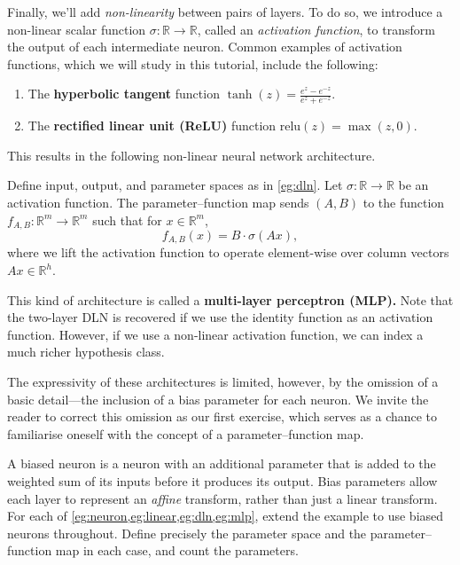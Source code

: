 \documentclass[11pt]{article}
\newcommand{\R}{\mathbb{R}}
\newcommand{\relu}{\mathrm{relu}}
\begin{document}
Finally, we'll add \emph{non-linearity} between pairs of layers. To do so, we
introduce a non-linear scalar function $\sigma : \R \to \R$, called an
\emph{activation function}, to transform the output of each intermediate
neuron. Common examples of activation functions, which we will study in this
tutorial, include the following:
\begin{enumerate}
    \item
        The \textbf{hyperbolic tangent} function
            $\displaystyle \tanh(z) = \frac{e^z-e^{-z}}{e^z + e^{-z}}$.
    \item
        The \textbf{rectified linear unit (ReLU)} function $\relu(z) = \max(z, 0)$.
\end{enumerate}
This results in the following non-linear neural network architecture.

\begin{example}\label{eg:mlp}
    Define input, output, and parameter spaces as in \cref{eg:dln}.
    Let $\sigma : \R \to \R$ be an activation function.
    The parameter--function map sends $(A, B)$ to the function
        $f_{A,B} : \R^m \to \R^m$ such that for $x \in \R^m$,
    \begin{equation}
        f_{A,B}(x)
        = B \cdot \sigma( A x ),
    \end{equation}
    where we lift the activation function to operate element-wise over column
    vectors $A x \in \R^h$.
\end{example}
This kind of architecture is called a \textbf{multi-layer perceptron (MLP).}
Note that the two-layer DLN is recovered if we use the identity function as an
activation function. However, if we use a non-linear activation function, we
can index a much richer hypothesis class.

The expressivity of these architectures is limited, however, by the omission of
a basic detail---the inclusion of a bias parameter for each neuron. We invite
the reader to correct this omission as our first exercise, which serves as a
chance to familiarise oneself with the concept of a parameter--function map.

\begin{exercise}
\label{ex:biased-neurons}
    A biased neuron is a neuron with an additional parameter that is added to
    the weighted sum of its inputs before it produces its output. Bias
    parameters allow each layer to represent an \emph{affine} transform, rather
    than just a linear transform. For each of
    \cref{eg:neuron,eg:linear,eg:dln,eg:mlp}, extend the example to use
    biased neurons throughout. Define precisely the parameter space and the
    parameter--function map in each case, and count the parameters.
\end{exercise}
\end{document}
